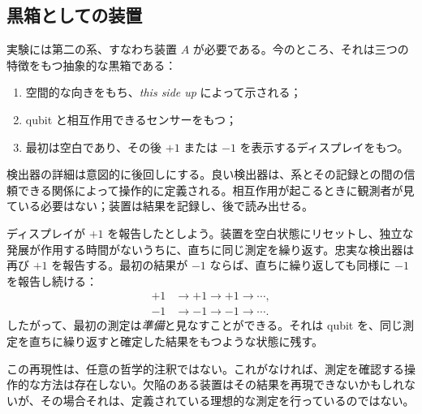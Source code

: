 \begin{classroomqa}
\end{classroomqa}

\subsection{黒箱としての装置}

実験には第二の系、すなわち装置 \(A\) が必要である。今のところ、それは三つの特徴をもつ抽象的な黒箱である：
\begin{enumerate}
  \item 空間的な向きをもち、\emph{this side up} によって示される；
  \item qubit と相互作用できるセンサーをもつ；
  \item 最初は空白であり、その後 \(+1\) または \(-1\) を表示するディスプレイをもつ。
\end{enumerate}
検出器の詳細は意図的に後回しにする。良い検出器は、系とその記録との間の信頼できる関係によって操作的に定義される。相互作用が起こるときに観測者が見ている必要はない；装置は結果を記録し、後で読み出せる。

ディスプレイが \(+1\) を報告したとしよう。装置を空白状態にリセットし、独立な発展が作用する時間がないうちに、直ちに同じ測定を繰り返す。忠実な検出器は再び \(+1\) を報告する。最初の結果が \(-1\) ならば、直ちに繰り返しても同様に \(-1\) を報告し続ける：
\begin{equation}
\begin{aligned}
  +1&\longrightarrow +1\longrightarrow +1\longrightarrow\cdots,\\
  -1&\longrightarrow -1\longrightarrow -1\longrightarrow\cdots.
\end{aligned}
\end{equation}
したがって、最初の測定は\emph{準備}と見なすことができる。それは qubit を、同じ測定を直ちに繰り返すと確定した結果をもつような状態に残す。

この再現性は、任意の哲学的注釈ではない。これがなければ、測定を確認する操作的な方法は存在しない。欠陥のある装置はその結果を再現できないかもしれないが、その場合それは、定義されている理想的な測定を行っているのではない。

\begin{classroomqa}
\end{classroomqa}

